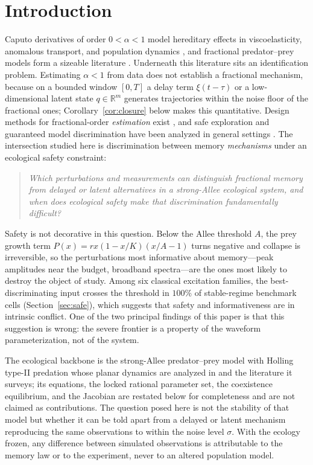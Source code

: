 \documentclass[mathematics,article,accept,pdftex,moreauthors]{Definitions/mdpi}
\begin{document}
\section{Introduction}
\label{sec:intro}

Caputo derivatives of order $0<\alpha<1$ model hereditary effects in viscoelasticity, anomalous transport, and population dynamics \cite{Podlubny1999,Diethelm2010,Kilbas2006,Mainardi2010}, and fractional predator--prey models form a sizeable literature \cite{Ahmed2007,Javidi2013,Vargas2015,Rihan2021}. Underneath this literature sits an identification problem. Estimating $\alpha<1$ from data does not establish a fractional mechanism, because on a bounded window $[0,T]$ a delay term $\xi(t-\tau)$ or a low-dimensional latent state $q\in\mathbb{R}^{m}$ generates trajectories within the noise floor of the fractional ones; Corollary~\ref{cor:closure} below makes this quantitative. Design methods for fractional-order \emph{estimation} exist \cite{FOED1,FOED2,FOED3}, and safe exploration and guaranteed model discrimination have been analyzed in general settings \cite{Sui2015,Harirchi2018}. The intersection studied here is discrimination between memory \emph{mechanisms} under an ecological safety constraint:

\begin{quote}
\emph{Which perturbations and measurements can distinguish fractional memory from delayed or latent alternatives in a strong-Allee ecological system, and when does ecological safety make that discrimination fundamentally difficult?}
\end{quote}

Safety is not decorative in this question. Below the Allee threshold $A$, the prey growth term $P(x)=rx(1-x/K)(x/A-1)$ turns negative and collapse is irreversible, so the perturbations most informative about memory---peak amplitudes near the budget, broadband spectra---are the ones most likely to destroy the object of study. Among six classical excitation families, the best-discriminating input crosses the threshold in $100\%$ of stable-regime benchmark cells (Section~\ref{sec:safe}), which suggests that safety and informativeness are in intrinsic conflict. One of the two principal findings of this paper is that this suggestion is wrong: the severe frontier is a property of the waveform parameterization, not of the system.

The ecological backbone is the strong-Allee predator--prey model with Holling type-II predation whose planar dynamics are analyzed in \cite{Wang2011} and the literature it surveys; its equations, the locked rational parameter set, the coexistence equilibrium, and the Jacobian are restated below for completeness and are not claimed as contributions. The question posed here is not the stability of that model but whether it can be told apart from a delayed or latent mechanism reproducing the same observations to within the noise level $\sigma$. With the ecology frozen, any difference between simulated observations is attributable to the memory law or to the experiment, never to an altered population model.
\end{document}
